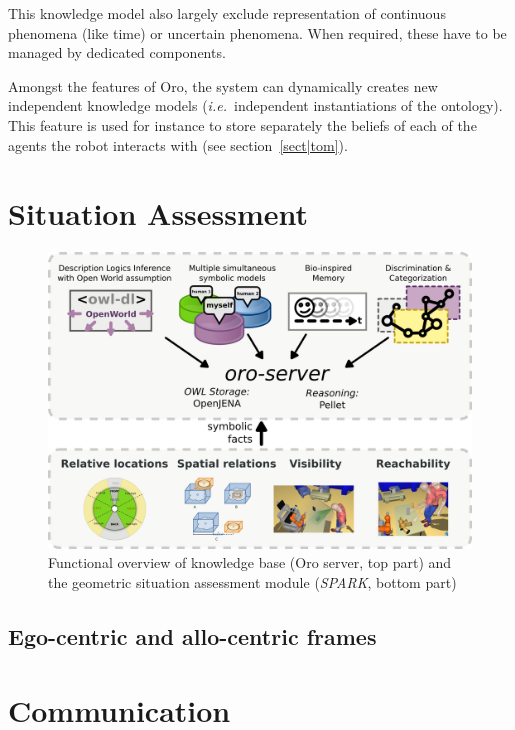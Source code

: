 \documentclass[letterpaper, 10 pt, conference]{ieeeconf}  %
\newcommand{\ie}{{\textit{i.e.\ }}}
\begin{document}
This knowledge model also largely exclude representation of continuous
phenomena (like time) or uncertain phenomena. When required, these have to be
managed by dedicated components.

Amongst the features of {\sc Oro}, the system can dynamically creates
new independent knowledge models (\ie independent instantiations of the
ontology). This feature is used for instance to store separately the beliefs of
each of the agents the robot interacts with (see section~\ref{sect|tom}).


\section{Situation Assessment}
\label{sect|sit-ass}

\begin{figure}
        \centering
        \includegraphics[width=\columnwidth]{spark-oro}
    \caption{Functional overview of knowledge base ({\sc Oro} server, top part) and the geometric situation assessment module (\emph{SPARK}, bottom part)}
        \label{fig|spark-oro}
\end{figure}

\cite{Sisbot2011}

\subsection{Ego-centric and allo-centric frames}

\section{Communication}
\label{sect|com}
\end{document}
